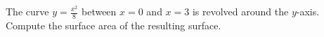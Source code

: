 \documentclass{ximera}
\begin{document}
\begin{question}
 The curve $y = \frac{x^2}{8}$ between $x=0$ and $x = 3$ is revolved around the $y$-axis. Compute the surface area of the resulting surface.
\begin{multipleChoice}
\end{multipleChoice}
\end{question}
\end{document}
